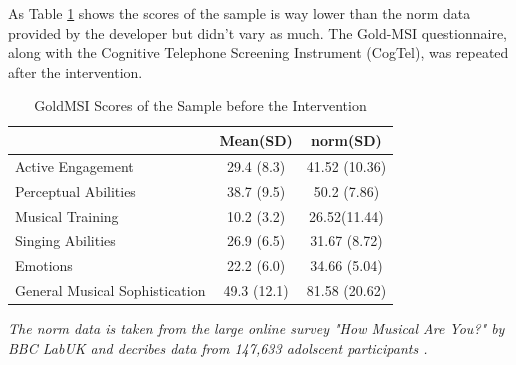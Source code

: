 As Table \ref{tab:goldmsi} shows the scores of the sample is way lower than the norm data provided by the developer but didn't vary as much. The Gold-MSI questionnaire, along with the Cognitive Telephone Screening Instrument (CogTel), was repeated after the intervention.
\begin{table}[h]
	\centering
	\caption{GoldMSI Scores of the Sample before the Intervention}
	\label{tab:goldmsi}
			\renewcommand{\arraystretch}{1.2}
	\vspace{\medskipamount}
	\begin{tabular}{lcc}
		&    Mean(SD)  & norm(SD)    \\
		\hline
		Active Engagement        & 29.4 (8.3) & 41.52 (10.36)\\
		Perceptual Abilities & 38.7 (9.5)& 50.2 (7.86)\\
		Musical Training    & 10.2 (3.2) &26.52(11.44)\\
		Singing Abilities     & 26.9 (6.5)  &31.67 (8.72)\\
		Emotions         & 22.2 (6.0)  & 34.66 (5.04) \\
		General Musical Sophistication            & 49.3 (12.1) & 81.58 (20.62) \\
	\end{tabular}\par
	\vspace{\medskipamount}
	\textit{The norm data is taken from the large online survey "How Musical Are You?" by BBC LabUK and decribes data from 147,633 adolscent participants \cite{Mullensiefen2013}.}
\end{table}
